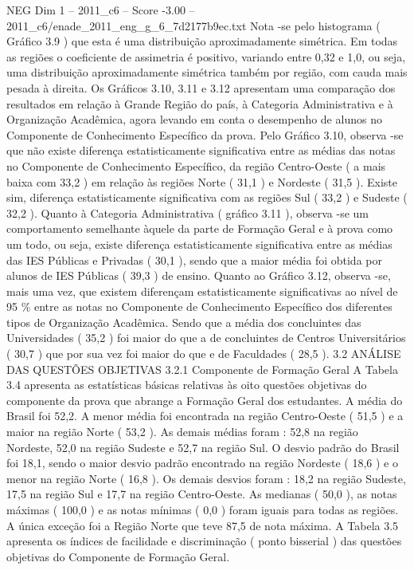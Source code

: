 \begin{textsample}{NEG Dim 1 – 2011\_c6 – Score -3.00 – 2011\_c6/enade\_2011\_eng\_g\_6\_7d2177b9ec.txt}
Nota -se pelo histograma ( Gráfico 3.9 ) que esta é uma distribuição aproximadamente simétrica.
Em todas as regiões o coeficiente de assimetria é positivo, variando entre 0,32 e 1,0, ou seja, uma distribuição aproximadamente simétrica também por região, com cauda mais pesada à direita.
Os Gráficos 3.10, 3.11 e 3.12 apresentam uma comparação dos resultados em relação à Grande Região do país, à Categoria Administrativa e à Organização Acadêmica, agora levando em conta o desempenho de alunos no Componente de Conhecimento Específico da prova.
Pelo Gráfico 3.10, observa -se que não existe diferença estatisticamente significativa entre as médias das notas no Componente de Conhecimento Específico, da região Centro-Oeste ( a mais baixa com 33,2 ) em relação às regiões Norte ( 31,1 ) e Nordeste ( 31,5 ).
Existe sim, diferença estatisticamente significativa com as regiões Sul ( 33,2 ) e Sudeste ( 32,2 ).
Quanto à Categoria Administrativa ( gráfico 3.11 ), observa -se um comportamento semelhante àquele da parte de Formação Geral e à prova como um todo, ou seja, existe diferença estatisticamente significativa entre as médias das IES Públicas e Privadas ( 30,1 ), sendo que a maior média foi obtida por alunos de IES Públicas ( 39,3 ) de ensino.
Quanto ao Gráfico 3.12, observa -se, mais uma vez, que existem diferençam estatisticamente significativas ao nível de 95 \% entre as notas no Componente de Conhecimento Específico dos diferentes tipos de Organização Acadêmica.
Sendo que a média dos concluintes das Universidades ( 35,2 ) foi maior do que a de concluintes de Centros Universitários ( 30,7 ) que por sua vez foi maior do que e de Faculdades ( 28,5 ). 3.2 ANÁLISE DAS QUESTÕES OBJETIVAS 3.2.1 Componente de Formação Geral A Tabela 3.4 apresenta as estatísticas básicas relativas às oito questões objetivas do componente da prova que abrange a Formação Geral dos estudantes.
A média do Brasil foi 52,2.
A menor média foi encontrada na região Centro-Oeste ( 51,5 ) e a maior na região Norte ( 53,2 ).
As demais médias foram : 52,8 na região Nordeste, 52,0 na região Sudeste e 52,7 na região Sul.
O desvio padrão do Brasil foi 18,1, sendo o maior desvio padrão encontrado na região Nordeste ( 18,6 ) e o menor na região Norte ( 16,8 ).
Os demais desvios foram : 18,2 na região Sudeste, 17,5 na região Sul e 17,7 na região Centro-Oeste.
As medianas ( 50,0 ), as notas máximas ( 100,0 ) e as notas mínimas ( 0,0 ) foram iguais para todas as regiões.
A única exceção foi a Região Norte que teve 87,5 de nota máxima.
A Tabela 3.5 apresenta os índices de facilidade e discriminação ( ponto bisserial ) das questões objetivas do Componente de Formação Geral.

\end{textsample}
